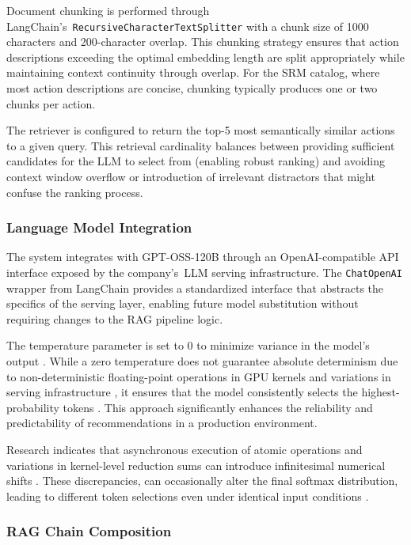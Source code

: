 Document chunking is performed through LangChain's~\texttt{RecursiveCharacterTextSplitter} with a chunk size of 1000 characters and 200-character overlap. This chunking strategy ensures that action descriptions exceeding the optimal embedding length are split appropriately while maintaining context continuity through overlap. For the SRM catalog, where most action descriptions are concise, chunking typically produces one or two chunks per action.

The retriever is configured to return the top-5 most semantically similar actions to a given query. This retrieval cardinality balances between providing sufficient candidates for the LLM to select from (enabling robust ranking) and avoiding context window overflow or introduction of irrelevant distractors that might confuse the ranking process.

\subsubsection{Language Model Integration}

The system integrates with GPT-OSS-120B \cite{mekrache2025ossgpt} through an OpenAI-compatible API interface exposed by the company's~LLM serving infrastructure. The \texttt{ChatOpenAI} wrapper from LangChain provides a standardized interface that abstracts the specifics of the serving layer, enabling future model substitution without requiring changes to the RAG pipeline logic.

The temperature parameter is set to 0 to minimize variance in the model's output \cite{holtzman2020curiouscaseneuraltext}. While a zero temperature does not guarantee absolute determinism due to non-deterministic floating-point operations in GPU kernels and variations in serving infrastructure \cite{Ouyang_2025}, it ensures that the model consistently selects the highest-probability tokens \cite{holtzman2020curiouscaseneuraltext}. This approach significantly enhances the reliability and predictability of recommendations in a production environment.

Research indicates that asynchronous execution of atomic operations and variations in kernel-level reduction sums can introduce infinitesimal numerical shifts \cite{Ouyang_2025}. These discrepancies, can occasionally alter the final softmax distribution, leading to different token selections even under identical input conditions \cite{holtzman2020curiouscaseneuraltext}\cite{Ouyang_2025}.

\subsubsection{RAG Chain Composition}

